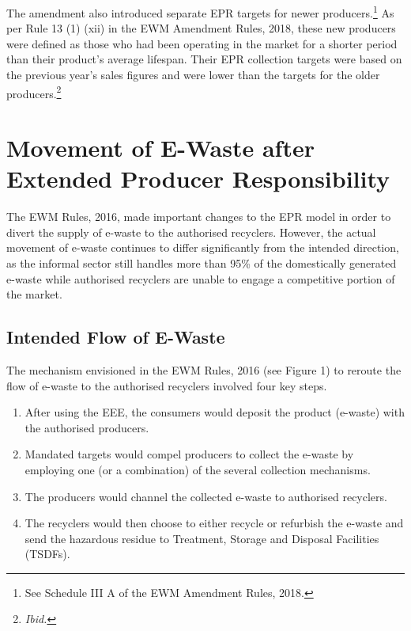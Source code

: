 \documentclass[a4paper, 12pt]{article}
\begin{document}
                    The amendment also introduced separate EPR targets for newer producers.\footnote{See Schedule III A of the EWM Amendment Rules, 2018.} As per Rule 13 (1) (xii) in the EWM Amendment Rules, 2018, these new producers were defined as those who had been operating in the market for a shorter period than their product’s average lifespan. Their EPR collection targets were based on the previous year’s sales figures and were lower than the targets for the older producers.\footnote{\textit{Ibid.}}                      
                    
\section{Movement of E-Waste after Extended Producer Responsibility}\label{sec:2}
                    
                    The EWM Rules, 2016, made important changes to the EPR model in order to divert the supply of e-waste to the authorised recyclers. However, the actual movement of e-waste continues to differ significantly from the intended direction, as the informal sector still handles more than 95\% of the domestically generated e-waste \parencite{assochamstats} while authorised recyclers are unable to engage a competitive portion of the market.

\subsection{Intended Flow of E-Waste}
                    
                    The mechanism envisioned in the EWM Rules, 2016 (see Figure 1) to reroute the flow of e-waste to the authorised recyclers involved four key steps.                     
\begin{enumerate}
\item After using the EEE, the consumers would deposit the product (e-waste) with the authorised producers.
\item Mandated targets would compel producers to collect the e-waste by employing one (or a combination) of the several collection mechanisms. 
\item The producers would channel the collected e-waste to authorised recyclers.
\item The recyclers would then choose to either recycle or refurbish the e-waste and send the hazardous residue to Treatment, Storage and Disposal Facilities (TSDFs).
\end{enumerate}
                    
\end{document}
